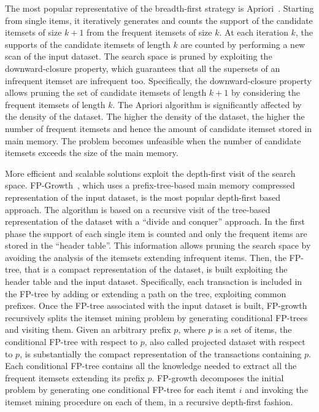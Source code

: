 \documentclass[preprint,review,12pt]{elsarticle}
\begin{document}
The most popular representative of the breadth-first strategy is Apriori~\cite{apriori}. Starting from single items, it iteratively generates and counts the support of the candidate itemsets of size $k+1$ from the frequent itemsets of size $k$. At each iteration $k$, the supports of the candidate itemsets of length $k$ are counted by performing a new scan of the input dataset.
The search space is pruned by exploiting the downward-closure property, which guarantees that all the supersets of an infrequent itemset are infrequent
too. Specifically, the downward-closure property allows pruning the set of candidate itemsets of length $k+1$ by considering the 
frequent itemsets of length $k$.
The Apriori algorithm is significantly affected by the density of the dataset.
The higher the density of the dataset, the higher the number of frequent itemsets and hence the amount of candidate 
itemset stored in main memory. The problem becomes unfeasible when the number of candidate itemsets exceeds the size of the main memory.


More efficient and scalable solutions exploit the depth-first visit of the search space. 
FP-Growth~\cite{Han00}, which uses a prefix-tree-based main memory compressed representation of the input dataset, is the most popular depth-first based approach. 
The algorithm is based on a recursive visit of the tree-based representation of the dataset with a
``divide and conquer'' approach. In the first phase the support of each single item is
counted and only the frequent items are stored in the ``header table''. This information allows pruning the search space by avoiding the analysis of the itemsets extending infrequent items. Then, the FP-tree, that is a compact representation of the dataset, is built exploiting 
the header table and the input dataset. Specifically, each transaction is included in the FP-tree by adding or
extending a path on the tree, exploiting common prefixes. 
Once the FP-tree associated with the input dataset is built, FP-growth recursively splits the itemset mining problem 
by generating conditional FP-trees and visiting them.  Given an arbitrary prefix $p$, where $p$ is a set of items, the conditional FP-tree with respect to 
$p$, also called projected dataset with respect to $p$, is substantially the compact representation of the transactions containing  $p$. Each conditional FP-tree contains all the knowledge needed to extract all the frequent itemsets extending its prefix $p$. FP-growth decomposes the initial problem by generating one conditional FP-tree for each itemt $i$ and invoking
the itemset mining procedure on each of them, in a recursive depth-first fashion. 
\end{document}
